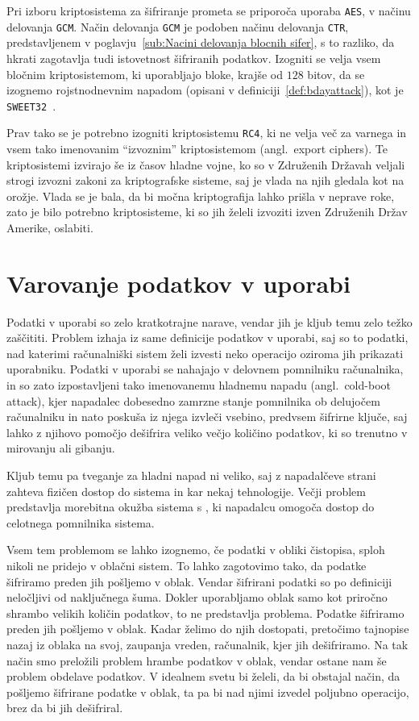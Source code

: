 \documentclass[12pt,a4paper,openany,tikz]{book}
\theoremstyle{plain}
\theoremstyle{definition}
\begin{document}
Pri izboru kriptosistema za šifriranje prometa se priporoča uporaba \texttt{AES}, v načinu delovanja \texttt{GCM}. Način delovanja \texttt{GCM} je podoben načinu delovanja \texttt{CTR}, predstavljenem v poglavju~\ref{sub:Nacini delovanja blocnih sifer}, s to razliko, da hkrati zagotavlja tudi istovetnost šifriranih podatkov. Izogniti se velja vsem bločnim kriptosistemom, ki uporabljajo bloke, krajše od $128$ bitov, da se izognemo rojstnodnevnim napadom (opisani v definiciji~\ref{def:bdayattack}), kot je \texttt{SWEET32}~\cite{sweet32}.

Prav tako se je potrebno izogniti kriptosistemu \texttt{RC4}, ki ne velja več za varnega in vsem tako imenovanim ``izvoznim'' kriptosistemom (angl.\ export ciphers). Te kriptosistemi izvirajo še iz časov hladne vojne, ko so v Združenih Državah veljali strogi izvozni zakoni za kriptografske sisteme, saj je vlada na njih gledala kot na orožje. Vlada se je bala, da bi močna kriptografija lahko prišla v neprave roke, zato je bilo potrebno kriptosisteme, ki so jih želeli izvoziti izven Združenih Držav Amerike, oslabiti.


\section{Varovanje podatkov v uporabi}
\label{sec:Varovanje podatkov v uporabi}

Podatki v uporabi so zelo kratkotrajne narave, vendar jih je kljub temu zelo težko zaščititi. Problem izhaja iz same definicije podatkov v uporabi, saj so to podatki, nad katerimi računalniški sistem želi izvesti neko operacijo oziroma jih prikazati uporabniku. Podatki v uporabi se nahajajo v delovnem pomnilniku računalnika, in so zato izpostavljeni tako imenovanemu hladnemu napadu (angl.\ cold-boot attack), kjer napadalec dobesedno zamrzne stanje pomnilnika ob delujočem računalniku in nato poskuša iz njega izvleči vsebino, predvsem šifrirne ključe, saj lahko z njihovo pomočjo dešifrira veliko večjo količino podatkov, ki so trenutno v mirovanju ali gibanju.

Kljub temu pa tveganje za hladni napad ni veliko, saj z napadalčeve strani zahteva fizičen dostop do sistema in kar nekaj tehnologije. Večji problem predstavlja morebitna okužba sistema s , ki napadalcu omogoča dostop do celotnega pomnilnika sistema.

Vsem tem problemom se lahko izognemo, če podatki v obliki čistopisa, sploh nikoli ne pridejo v oblačni sistem. To lahko zagotovimo tako, da podatke šifriramo preden jih pošljemo v oblak. Vendar šifrirani podatki so po definiciji neločljivi od naključnega šuma. Dokler uporabljamo oblak samo kot priročno shrambo velikih količin podatkov, to ne predstavlja problema. Podatke šifriramo preden jih pošljemo v oblak. Kadar želimo do njih dostopati, pretočimo tajnopise nazaj iz oblaka na svoj, zaupanja vreden, računalnik, kjer jih dešifriramo. Na tak način smo preložili problem hrambe podatkov v oblak, vendar ostane nam še problem obdelave podatkov. V idealnem svetu bi želeli, da bi obstajal način, da pošljemo šifrirane podatke v oblak, ta pa bi nad njimi izvedel poljubno operacijo, brez da bi jih dešifriral.
\end{document}
